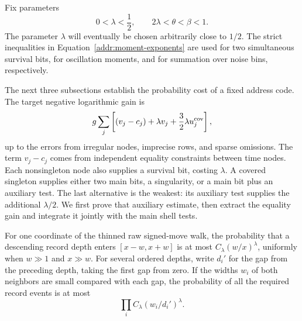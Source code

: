 Fix parameters
\begin{equation}\label{addr:moment-exponents}
                 0<\lambda<\frac12,
                 \qquad 2\lambda<\theta<\beta<1.
\end{equation}
The parameter $\lambda$ will eventually be chosen arbitrarily close
to $1/2$.  The strict inequalities in
Equation~\eqref{addr:moment-exponents} are used for two simultaneous
survival bits, for oscillation moments, and for summation over noise
bins, respectively.

The next three subsections establish the probability cost of a fixed
address code. The target negative logarithmic gain is
\[
 g\sum_j\left[(v_j-c_j)+\lambda v_j
                    +\frac32\lambda u_j^{\rm cov}\right],
\]
up to the errors from irregular nodes, imprecise rows, and sparse omissions.
The term $v_j-c_j$ comes from independent equality constraints between time
nodes. Each nonsingleton node also supplies a survival bit, costing
$\lambda$. A covered singleton supplies either two main bits, a singularity,
or a main bit plus an auxiliary test. The last alternative is the weakest:
its auxiliary test supplies the additional $\lambda/2$. We first prove
that auxiliary estimate, then extract the equality gain and integrate it
jointly with the main shell tests.

\begin{lemma}\label{addr:record-bound}
For one coordinate of the thinned raw signed-move walk, the probability
that a descending record depth enters $[x-w,x+w]$ is at most
$C_\lambda(w/x)^\lambda$, uniformly when $w\gg1$ and $x\gg w$.
For several ordered depths, write $d_i'$ for the gap from the preceding
depth, taking the first gap from zero.  If the widths $w_i$ of both
neighbors are small compared with each gap, the probability of all
the required record events is at most
\[
                       \prod_i C_\lambda(w_i/d_i')^\lambda.
\]
\end{lemma}

